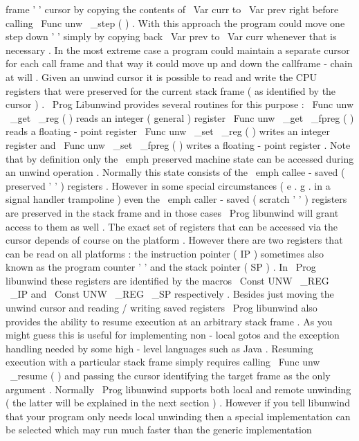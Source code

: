 frame
'
'
cursor
by
copying
the
contents
of
\
Var
{
curr
}
to
\
Var
{
prev
}
right
before
calling
\
Func
{
unw
\
_step
}
(
)
.
With
this
approach
the
program
could
move
one
step
down
'
'
simply
by
copying
back
\
Var
{
prev
}
to
\
Var
{
curr
}
whenever
that
is
necessary
.
In
the
most
extreme
case
a
program
could
maintain
a
separate
cursor
for
each
call
frame
and
that
way
it
could
move
up
and
down
the
callframe
-
chain
at
will
.
Given
an
unwind
cursor
it
is
possible
to
read
and
write
the
CPU
registers
that
were
preserved
for
the
current
stack
frame
(
as
identified
by
the
cursor
)
.
\
Prog
{
Libunwind
}
provides
several
routines
for
this
purpose
:
\
Func
{
unw
\
_get
\
_reg
}
(
)
reads
an
integer
(
general
)
register
\
Func
{
unw
\
_get
\
_fpreg
}
(
)
reads
a
floating
-
point
register
\
Func
{
unw
\
_set
\
_reg
}
(
)
writes
an
integer
register
and
\
Func
{
unw
\
_set
\
_fpreg
}
(
)
writes
a
floating
-
point
register
.
Note
that
by
definition
only
the
\
emph
{
preserved
}
machine
state
can
be
accessed
during
an
unwind
operation
.
Normally
this
state
consists
of
the
\
emph
{
callee
-
saved
}
(
preserved
'
'
)
registers
.
However
in
some
special
circumstances
(
e
.
g
.
in
a
signal
handler
trampoline
)
even
the
\
emph
{
caller
-
saved
}
(
scratch
'
'
)
registers
are
preserved
in
the
stack
frame
and
in
those
cases
\
Prog
{
libunwind
}
will
grant
access
to
them
as
well
.
The
exact
set
of
registers
that
can
be
accessed
via
the
cursor
depends
of
course
on
the
platform
.
However
there
are
two
registers
that
can
be
read
on
all
platforms
:
the
instruction
pointer
(
IP
)
sometimes
also
known
as
the
program
counter
'
'
and
the
stack
pointer
(
SP
)
.
In
\
Prog
{
libunwind
}
these
registers
are
identified
by
the
macros
\
Const
{
UNW
\
_REG
\
_IP
}
and
\
Const
{
UNW
\
_REG
\
_SP
}
respectively
.
Besides
just
moving
the
unwind
cursor
and
reading
/
writing
saved
registers
\
Prog
{
libunwind
}
also
provides
the
ability
to
resume
execution
at
an
arbitrary
stack
frame
.
As
you
might
guess
this
is
useful
for
implementing
non
-
local
gotos
and
the
exception
handling
needed
by
some
high
-
level
languages
such
as
Java
.
Resuming
execution
with
a
particular
stack
frame
simply
requires
calling
\
Func
{
unw
\
_resume
}
(
)
and
passing
the
cursor
identifying
the
target
frame
as
the
only
argument
.
Normally
\
Prog
{
libunwind
}
supports
both
local
and
remote
unwinding
(
the
latter
will
be
explained
in
the
next
section
)
.
However
if
you
tell
libunwind
that
your
program
only
needs
local
unwinding
then
a
special
implementation
can
be
selected
which
may
run
much
faster
than
the
generic
implementation
